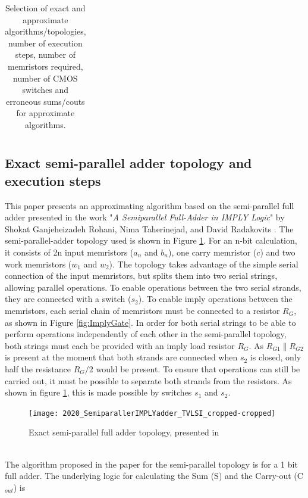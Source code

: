 \documentclass[]{IEEEtran}
\begin{document}
\begin{table}[]
\begin{tabular}{|c|c|c|c|c|c|cc|}
\end{tabular}
\caption{Selection of exact and approximate algorithms/topologies, number of execution steps, number of memristors required, number of CMOS switches and erroneous sums/couts for approximate algorithms.}
\label{tab:comparisonBIG}
\end{table}

\subsection{Exact semi-parallel adder topology and execution steps}
This paper presents an approximating algorithm based on the semi-parallel full adder presented in the work "\textit{A Semiparallel Full-Adder in IMPLY Logic}" by Shokat Ganjeheizadeh Rohani, Nima Taherinejad, and David Radakovits \cite{8832255}. 
The semi-parallel-adder topology used is shown in Figure \ref{fig:exactFullAdderTopology}. For an n-bit calculation, it consists of 2n input memristors ($a_{n}$ and $b_{n}$), one carry memristor ($c$) and two work memristors ($w_{1}$ and $w_{2}$).  The topology takes advantage of the simple serial connection of the input memristors, but splits them into two serial strings, allowing parallel operations. To enable operations between the two serial strands, they are connected with a switch ($s_{2}$). To enable imply operations between the memristors, each serial chain of memristors must be connected to a resistor $R_G$, as shown in Figure \ref{fig:ImplyGate}. In order for both serial strings to be able to perform operations independently of each other in the semi-parallel topology, both strings must each be provided with an imply load resistor $R_G$. As $R_{G1} \parallel R_{G2}$  is present at the moment that both strands are connected when $s_{2}$ is closed, only half the resistance $R_G/2$ would be present. To ensure that operations can still be carried out, it must be possible to separate both strands from the resistors. As shown in figure \ref{fig:exactFullAdderTopology}, this is made possible by switches $s_1$ and $s_2$.
\begin{figure}[h]
	\centering
	\texttt{[image: 2020\_SemiparallerIMPLYadder\_TVLSI\_cropped-cropped]}
	\caption{Exact semi-parallel full adder topology, presented in \cite{8832255}}
	\label{fig:exactFullAdderTopology}
\end{figure}
\\ The algorithm proposed in the paper for the semi-parallel topology is for a 1 bit full adder. The underlying logic for calculating the Sum (S) and the Carry-out (C$_{out}$) is
\end{document}
